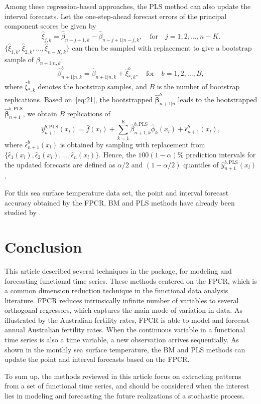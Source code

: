 \documentclass[nojss]{jss}
\begin{document}
Among these regression-based approaches, the PLS method can also update the interval forecasts. Let the one-step-ahead forecast errors of the principal component scores be given by
\begin{equation*}
  \hat{\xi}_{j,k}=\hat{\beta}_{n-j+1,k}-\hat{\beta}_{n-j+1|n-j,k},\quad \text{for}\quad j=1,2,\dots,n-K.
\end{equation*}
$\{\hat{\xi}_{1,k},\hat{\xi}_{2,k},\dots,\hat{\xi}_{n-K,k}\}$ can then be sampled with replacement to give a bootstrap sample of $\beta_{n+1|n,k}$:
\begin{equation*}
  \hat{\beta}^b_{n+1|n,k}=\hat{\beta}_{n+1|n,k}+\hat{\xi}_{*,k}^b,\quad \text{for}\quad b=1,2,\dots,B,
\end{equation*}
where $\hat{\xi}_{*,k}^b$ denotes the bootstrap samples, and $B$ is the number of bootstrap replications. Based on~\eqref{eq:21}, the bootstrapped $\hat{\bm{\beta}}_{n+1|n}^b$ leads to the bootstrapped $\hat{\bm{\beta}}_{n+1}^{b,\text{PLS}}$, we obtain $B$ replications of
\begin{equation*}
  \hat{y}^{b,\text{PLS}}_{n+1}(x_l)=\bar{f}(x_l)+\sum^K_{k=1}\hat{\beta}_{n+1,k}^{b,\text{PLS}}\hat{\phi}_k(x_l)+\hat{\epsilon}_{n+1}^b(x_l),
\end{equation*}
where $\hat{\epsilon}_{n+1}^b(x_l)$ is obtained by sampling with replacement from $\{\hat{\epsilon}_1(x_l),\hat{\epsilon}_2(x_l),\dots,\hat{\epsilon}_n(x_l)\}$. Hence, the $100(1-\alpha)\%$ prediction intervals for the updated forecasts are defined as $\alpha/2$ and $(1-\alpha/2)$ 
quantiles of $\hat{y}_{n+1}^{b,\text{PLS}}(x_l)$.

For this sea surface temperature data set, the point and interval forecast accuracy obtained by the FPCR, BM and PLS methods have already been studied by \cite{SH11}.

\section*{Conclusion}

This article described several techniques in the  package, for modeling and forecasting functional time series. These methods centered on the FPCR, which is a common dimension reduction technique in the functional data analysis literature. FPCR reduces intrinsically infinite number of variables to several orthogonal regressors, which captures the main mode of variation in data. As illustrated by the Australian fertility rates, FPCR is able to model and forecast annual Australian fertility rates. When the continuous variable in a functional time series is also a time variable, a new observation arrives sequentially. As shown in the monthly sea surface temperature, the BM and PLS methods can update the point and interval forecasts based on the FPCR. 

To sum up, the methods reviewed in this article focus on extracting patterns from a set of functional time series, and should be considered when the interest lies in modeling and forecasting the future realizations of a stochastic process.


    
  
\end{document}
